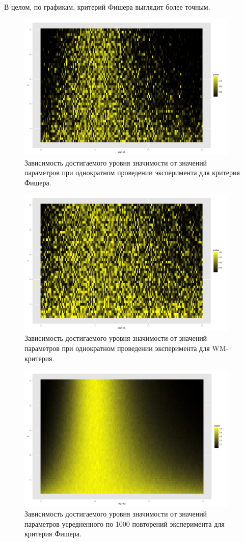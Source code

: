\documentclass[10pt]{article}
\begin{document}
В целом, по графикам, критерий Фишера выглядит более точным.

\begin{figure}[h]
  \centering
  \includegraphics[width=300pt]{f_pvalue_1.png}
  \caption{Зависимость достигаемого уровня значимости от значений параметров при однократном проведении эксперимента для критерия Фишера.}
\end{figure}

\begin{figure}[h]
  \centering
  \includegraphics[width=300pt]{wm_pvalue_1.png}
  \caption{Зависимость достигаемого уровня значимости от значений параметров при однократном проведении эксперимента для WM-критерия.}
\end{figure}

\begin{figure}[h]
  \centering
  \includegraphics[width=300pt]{f_pvalue.png}
  \caption{Зависимость достигаемого уровня значимости от значений параметров усредненного по 1000 повторений эксперимента для критерия Фишера.}
\end{figure}
\end{document}
